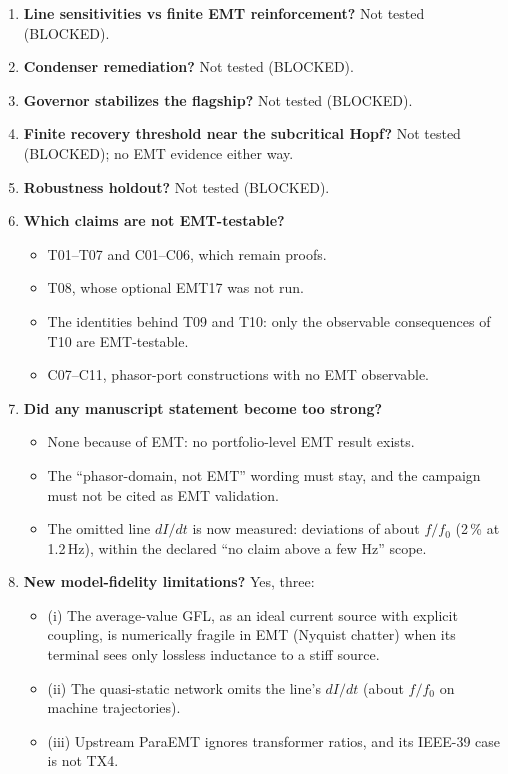 \documentclass[10pt,a4paper]{article}
\begin{document}
\begin{enumerate}[leftmargin=1.8em]
\item \textbf{Line sensitivities vs finite EMT reinforcement?} Not tested
  (BLOCKED).
\item \textbf{Condenser remediation?} Not tested (BLOCKED).
\item \textbf{Governor stabilizes the flagship?} Not tested (BLOCKED).
\item \textbf{Finite recovery threshold near the subcritical Hopf?} Not tested
  (BLOCKED); no EMT evidence either way.
\item \textbf{Robustness holdout?} Not tested (BLOCKED).
\item \textbf{Which claims are not EMT-testable?}
  \begin{itemize}
  \item T01--T07 and C01--C06, which remain proofs.
  \item T08, whose optional EMT17 was not run.
  \item The identities behind T09 and T10: only the observable consequences of
    T10 are EMT-testable.
  \item C07--C11, phasor-port constructions with no EMT observable.
  \end{itemize}
\item \textbf{Did any manuscript statement become too strong?}
  \begin{itemize}
  \item None because of EMT: no portfolio-level EMT result exists.
  \item The ``phasor-domain, not EMT'' wording must stay, and the campaign must
    not be cited as EMT validation.
  \item The omitted line $dI/dt$ is now measured: deviations of about $f/f_0$
    (2\,\% at 1.2\,Hz), within the declared ``no claim above a few Hz''
    scope.
  \end{itemize}
\item \textbf{New model-fidelity limitations?} Yes, three:
  \begin{itemize}
  \item (i) The average-value GFL, as an ideal current source with explicit
    coupling, is numerically fragile in EMT (Nyquist chatter) when its
    terminal sees only lossless inductance to a stiff source.
  \item (ii) The quasi-static network omits the line's $dI/dt$ (about $f/f_0$
    on machine trajectories).
  \item (iii) Upstream ParaEMT ignores transformer ratios, and its IEEE-39
    case is not TX4.

\end{itemize}
\end{enumerate}
\end{document}
